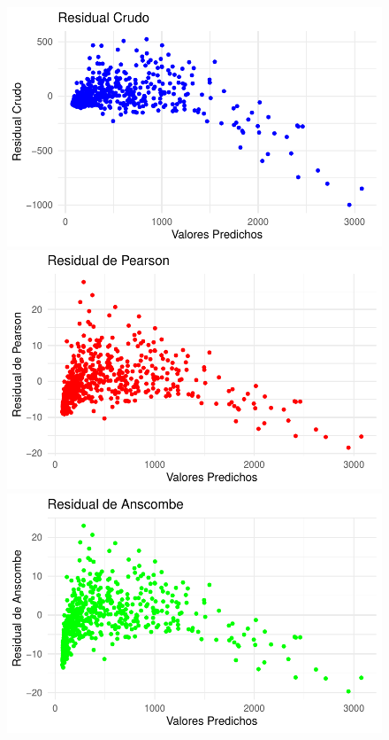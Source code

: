 \documentclass[
  letterpaper,
  DIV=11,
  numbers=noendperiod]{scrartcl}
\begin{document}
\begin{figure}

\begin{minipage}{0.50\linewidth}
\includegraphics{Modelos_files/figure-pdf/unnamed-chunk-14-1.pdf}\end{minipage}%
%
\begin{minipage}{0.50\linewidth}
\includegraphics{Modelos_files/figure-pdf/unnamed-chunk-14-2.pdf}\end{minipage}%
\newline
\begin{minipage}{0.50\linewidth}
\includegraphics{Modelos_files/figure-pdf/unnamed-chunk-14-3.pdf}\end{minipage}%

\end{figure}
\end{document}
